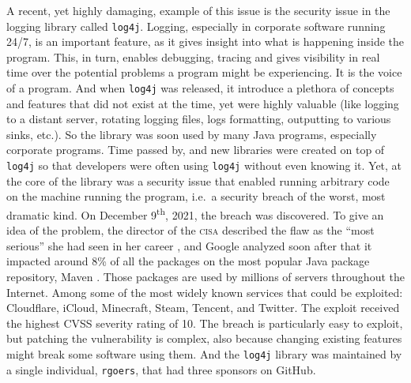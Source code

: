 A recent, yet highly damaging, example of this issue is the security issue in the logging library called \texttt{log4j}.
Logging, especially in corporate software running 24/7, is an important feature, as it gives insight into what is happening inside the program.
This, in turn, enables debugging, tracing and gives visibility in real time over the potential problems a program might be experiencing.
It is the voice of a program.
And when \texttt{log4j} was released, it introduce a plethora of concepts and features that did not exist at the time, yet were highly valuable (like logging to a distant server, rotating logging files, logs formatting, outputting to various sinks, etc.).
So the library was soon used by many Java programs, especially corporate programs.
Time passed by, and new libraries were created on top of \texttt{log4j} so that developers were often using \texttt{log4j} without even knowing it.
Yet, at the core of the library was a security issue that enabled running arbitrary code on the machine running the program, i.e.\ a security breach of the worst, most dramatic kind.
On December 9\textsuperscript{th}, 2021, the breach was discovered.
To give an idea of the problem, the director of the \textsc{cisa}%
 described the flaw as the \enquote{most serious} she had seen in her career \cite{noauthor_cisa_nodate}, and Google analyzed soon after that it impacted around 8\% of all the packages on the most popular Java package repository, Maven \cite{noauthor_understanding_nodate}.
Those packages are used by millions of servers throughout the Internet.
Among some of the most widely known services that could be exploited: Cloudflare, iCloud, Minecraft, Steam, Tencent, and Twitter.
The exploit received the highest CVSS severity rating of 10.
The breach is particularly easy to exploit, but patching the vulnerability is complex, also because changing existing features might break some software using them.
And the \texttt{log4j} library was maintained by a single individual, \texttt{rgoers}, that had three sponsors on GitHub.

